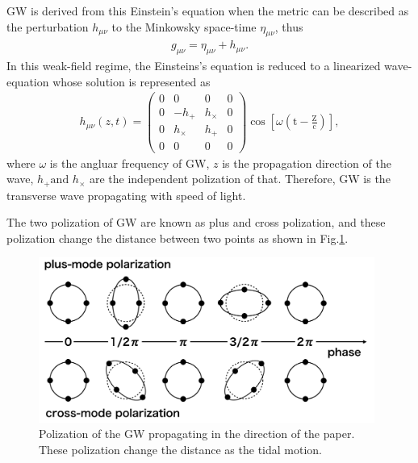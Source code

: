 GW is derived from this Einstein's equation when the metric can be described as the perturbation $h_{\mu\nu}$ to the Minkowsky space-time $\eta_{\mu\nu}$, thus
\begin{eqnarray}
  g_{\mu \nu}=\eta_{\mu \nu}+h_{\mu \nu}.
\end{eqnarray}
In this weak-field regime, the Einsteins's equation is reduced to a linearized wave-equation whose solution is represented as
\begin{eqnarray}
  h_{\mu \nu}(z, t)=\left(\begin{array}{cccc}{0} & {0} & {0} & {0} \\ {0} & {-h_{+}} & {h_{\times}} & {0} \\ {0} & {h_{\times}} & {h_{+}} & {0} \\ {0} & {0} & {0} & {0}\end{array}\right) \cos \left[\omega\left(\mathrm{t}-\frac{\mathrm{Z}}{\mathrm{c}}\right)\right],
\end{eqnarray}
where $\omega$ is the angluar frequency of GW, $z$ is the propagation direction of the wave, $h_{+} \text {and } h_{\times}$ are the independent polization of that. Therefore, GW is the transverse wave propagating with speed of light.

The two polization of GW are known as plus and cross polization, and these polization change the distance between two points as shown in Fig.\ref{img:img131}. 

\begin{figure}[h]
  \begin{center}   
    \includegraphics[width=11.0cm]{./img_chap1/img131.png}
    \caption[Polization of the GW]{Polization of the GW propagating in the direction of the paper. These polization change the distance as the tidal motion.
}\label{img:img131}
  \end{center}
\end{figure}


